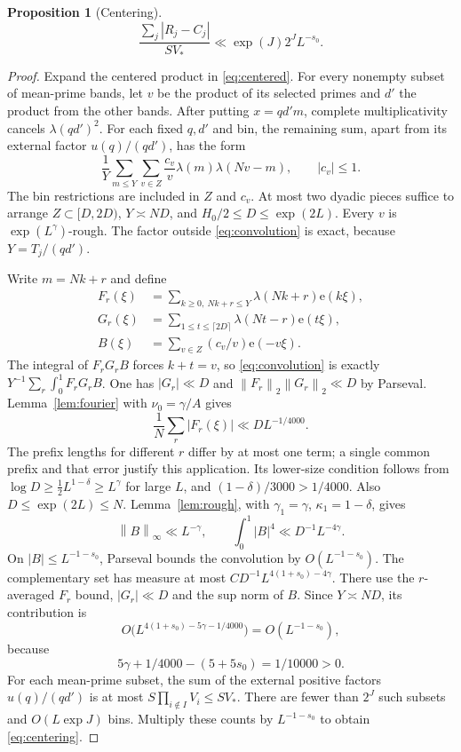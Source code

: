 \documentclass[11pt]{article}
\newtheorem{proposition}[theorem]{Proposition}
\theoremstyle{definition}
\newcommand{\e}{\mathrm e}
\newcommand{\norm}[1]{\left\lVert#1\right\rVert}
\begin{document}
\begin{proposition}[Centering]\label{prop:centering}
\begin{equation}\label{eq:centering}
 \frac{\sum_j|R_j-C_j|}{SV_*}
 \ll\exp(J)2^J L^{-s_0}.
\end{equation}
\end{proposition}
\begin{proof}
Expand the centered product in \eqref{eq:centered}.
For every nonempty subset of mean-prime bands, let $v$ be the product
of its selected primes and $d'$ the product from the other bands.
After putting $x=qd'm$, complete multiplicativity cancels
$\lambda(qd')^2$. For each fixed $q,d'$ and bin, the remaining sum,
apart from its external factor $u(q)/(qd')$, has the form
\begin{equation}\label{eq:convolution}
 \frac1Y\sum_{m\le Y}\sum_{v\in Z}\frac{c_v}{v}
                                \lambda(m)\lambda(Nv-m),\qquad |c_v|\le1.
\end{equation}
The bin restrictions are included in $Z$ and $c_v$.
At most two dyadic pieces suffice to arrange
$Z\subset[D,2D)$, $Y\asymp ND$, and
$H_0/2\le D\le\exp(2L)$.
Every $v$ is $\exp(L^\gamma)$-rough.
The factor outside \eqref{eq:convolution} is exact, because
$Y=T_j/(qd')$.

Write $m=Nk+r$ and define
\begin{align*}
 F_r(\xi)&=\sum_{k\ge0,\ Nk+r\le Y}\lambda(Nk+r)\e(k\xi),\\
 G_r(\xi)&=\sum_{1\le t\le\lceil2D\rceil}\lambda(Nt-r)\e(t\xi),\\
 B(\xi)&=\sum_{v\in Z}(c_v/v)\e(-v\xi).
\end{align*}
The integral of $F_rG_rB$ forces $k+t=v$, so
\eqref{eq:convolution} is exactly
$Y^{-1}\sum_r\int_0^1F_rG_rB$.
One has $|G_r|\ll D$ and
$\norm{F_r}_2\norm{G_r}_2\ll D$ by Parseval.
Lemma~\ref{lem:fourier} with $\nu_0=\gamma/A$ gives
\[
 \frac1N\sum_r|F_r(\xi)|\ll D L^{-1/4000}.
\]
The prefix lengths for different $r$ differ by at most one term; a
single common prefix and that error justify this application.
Its lower-size condition follows from
$\log D\ge\tfrac12L^{1-\delta}\ge L^\gamma$ for large $L$, and
$(1-\delta)/3000>1/4000$.
Also $D\le\exp(2L)\le N$.
Lemma~\ref{lem:rough}, with $\gamma_1=\gamma$,
$\kappa_1=1-\delta$, gives
\[
 \norm B_\infty\ll L^{-\gamma},\qquad
 \int_0^1|B|^4\ll D^{-1}L^{-4\gamma}.
\]
On $|B|\le L^{-1-s_0}$, Parseval bounds the convolution by
$O(L^{-1-s_0})$.
The complementary set has measure at most
$C D^{-1}L^{4(1+s_0)-4\gamma}$.
There use the $r$-averaged $F_r$ bound, $|G_r|\ll D$ and the sup norm
of $B$. Since $Y\asymp ND$, its contribution is
\[
 O\bigl(L^{4(1+s_0)-5\gamma-1/4000}\bigr)
       =O(L^{-1-s_0}),
\]
because
\begin{equation}\label{eq:margin}
 5\gamma+1/4000-(5+5s_0)=1/10000>0.
\end{equation}
For each mean-prime subset, the sum of the external positive factors
$u(q)/(qd')$ is at most $S\prod_{i\notin I}V_i\le SV_*$.
There are fewer than $2^J$ such subsets and $O(L\exp J)$ bins.
Multiply these counts by $L^{-1-s_0}$ to obtain \eqref{eq:centering}.
\end{proof}
\end{document}
